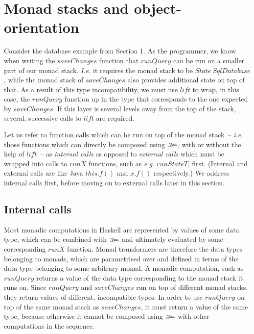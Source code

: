 \section{Monad stacks and object-orientation}
\label{sec:objects}

Consider the database example from Section 1. As the programmer, we know when writing the $\mathit{saveChanges}$ function that $\mathit{runQuery}$ can be run on a smaller part of our monad stack. \emph{I.e.} it requires the monad stack to be $\mathit{State}~\mathit{SqlDatabase}$, while the monad stack of $\mathit{saveChanges}$ also provides additional state on top of that. As a result of this type incompatibility, we must use $\mathit{lift}$ to wrap, in this case, the $\mathit{runQuery}$ function up in the type that corresponds to the one expected by $\mathit{saveChanges}$. If this layer is several levels away from the top of the stack, several, successive calls to $\mathit{lift}$ are required.

Let us refer to function calls which can be run on top of the monad stack~-- \emph{i.e.} those functions which can directly be composed using $\gg\!\!=$, with or without the help of $\mathit{lift}$~-- as \emph{internal calls} as opposed to \emph{external calls} which must be wrapped into calls to $\mathit{runX}$ functions, such as \emph{e.g.} $\mathit{runStateT}$, first.
(Internal and external calls are like Java $\mathit{this}.f()$ and $x.f()$
respectively.)
We address internal calls first, before moving on to external calls later in this section.

\subsection{Internal calls}

Most monadic computations in Haskell are represented by values of some data type, which can be combined with $\gg\!\!=$ and ultimately evaluated by some corresponding $\mathit{runX}$ function. Monad transformers are therefore the data types belonging to monads, which are parametrised over and defined in terms of the data type belonging to some arbitrary monad. A monadic computation, such as $\mathit{runQuery}$ returns a value of the data type corresponding to the monad stack it runs on. Since $\mathit{runQuery}$ and $\mathit{saveChanges}$ run on top of different monad stacks, they return values of different, incompatible types. In order to use $\mathit{runQuery}$ on top of the same monad stack as $\mathit{saveChanges}$, it must return a value of the same type, because otherwise it cannot be composed using $\gg\!\!=$ with other computations in the sequence. 

